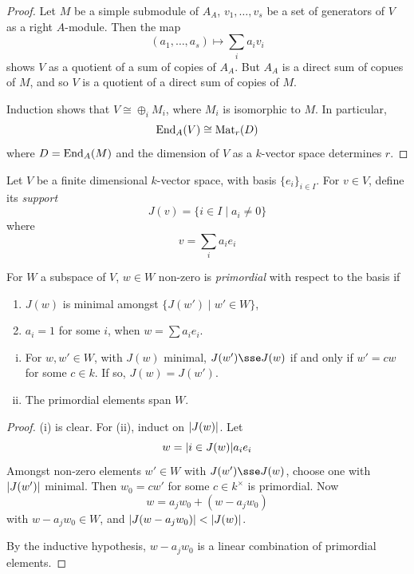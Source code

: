 \documentclass{article}
\begin{document}
\begin{proof}
    Let \(M\) be a simple submodule of \(A_A\), \(v_1, \dots, v_s\) be a set of generators of \(V\) as a right \(A\)-module. Then the map
    \[(a_1, \dots, a_s) \mapsto \sum_i a_iv_i\]
    shows \(V\) as a quotient of a sum of copies of \(A_A\). But \(A_A\) is a direct sum of copues of \(M\), and so \(V\) is a quotient of a direct sum of copies of \(M\).

    Induction shows that \(V \cong \oplus_i M_i\), where \(M_i\) is isomorphic to \(M\). In particular,
    \[\operatorname{End}_A(V) \cong \operatorname{Mat}_r(D)\]
    where \(D = \operatorname{End}_A(M)\) and the dimension of \(V\) as a \(k\)-vector space determines \(r\).
\end{proof}

\lec

\begin{definition}
    Let \(V\) be a finite dimensional \(k\)-vector space, with basis \(\{e_i\}_{i \in I}\). For \(v \in V\), define its \emph{support}
    \[J(v) = \{i \in I \mid a_i \ne 0\}\]
    where
    \[v = \sum_i a_i e_i\]

    For \(W\) a subspace of \(V\), \(w \in W\) non-zero is \emph{primordial} with respect to the basis if
    \begin{enumerate}
        \item \(J(w)\) is minimal amongst \(\{J(w') \mid w' \in W\}\),
        \item \(a_i = 1\) for some \(i\), when \(w = \sum a_i e_i\).
    \end{enumerate}
\end{definition}

\begin{lemma}
    \begin{enumerate}[(i)]
        \item For \(w, w' \in W\), with \(J(w)\) minimal, \(J(w') \sse J(w)\) if and only if \(w' = cw\) for some \(c \in k\). If so, \(J(w) = J(w')\).
        \item The primordial elements span \(W\).
    \end{enumerate}
\end{lemma}

\begin{proof}
    (i) is clear. For (ii), induct on \(\abs{J(w)}\). Let
    \[w = \abs{i \in J(w)}a_ie_i\]
    Amongst non-zero elements \(w' \in W\) with \(J(w') \sse J(w)\), choose one with \(\abs{J(w')}\) minimal. Then \(w_0 = cw'\) for some \(c \in k^\times\) is primordial. Now
    \[w = a_jw_0 + (w - a_jw_0)\]
    with \(w - a_jw_0 \in W\), and \(\abs{J(w - a_jw_0)} < \abs{J(w)}\).
    
    By the inductive hypothesis, \(w - a_jw_0\) is a linear combination of primordial elements.
\end{proof}
\end{document}

